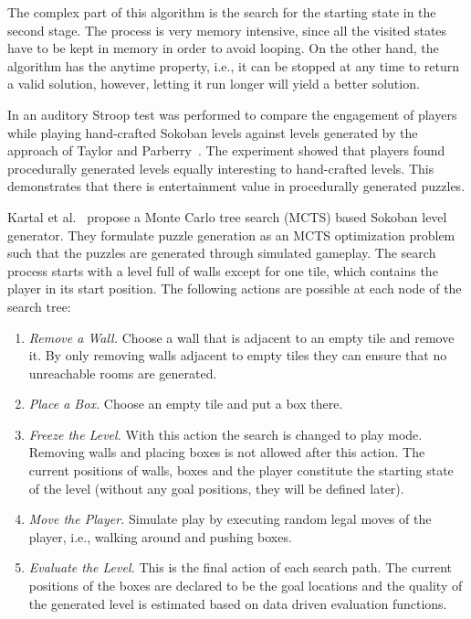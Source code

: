 \documentclass[runningheads]{llncs}
\begin{document}
The complex part of this algorithm is the search for the starting state in the second stage.
The process is very memory intensive, since all the visited states have to be kept in
memory in order to avoid looping. On the other hand, the algorithm has the anytime property, i.e., it
can be stopped at any time to return a valid solution, however, letting it run longer will yield
a better solution.

In \cite{taylor2015attention} an auditory Stroop test was performed to compare the engagement of
players while playing hand-crafted Sokoban levels against levels generated by the approach of
Taylor and Parberry~\cite{taylor2011procedural}. The experiment showed that players found
procedurally generated levels equally interesting to hand-crafted levels. This demonstrates
that there is entertainment value in procedurally generated puzzles.

Kartal et al.~\cite{kartal2016data} propose a Monte Carlo tree search (MCTS) based Sokoban level
generator. They formulate puzzle generation as an MCTS optimization problem such that the puzzles
are generated through simulated gameplay. The search process starts with a level full of walls except
for one tile, which contains the player in its start position. The following actions are possible at each
node of the search tree:
\begin{enumerate}
\item \emph{Remove a Wall.} Choose a wall that is adjacent to an empty tile and remove it. By only removing walls
adjacent to empty tiles they can ensure that no unreachable rooms are generated.
\item \emph{Place a Box.} Choose an empty tile and put a box there.
\item \emph{Freeze the Level.} With this action the search is changed to play mode. Removing walls and placing
boxes is not allowed after this action. The current positions of walls, boxes and the player constitute
the starting state of the level (without any goal positions, they will be defined later).
\item \emph{Move the Player.} Simulate play by executing random legal moves of the player, i.e., walking
around and pushing boxes.
\item \emph{Evaluate the Level.} This is the final action of each search path. The current positions of the boxes
are declared to be the goal locations and the quality of the generated level is estimated based on data driven
evaluation functions.
\end{enumerate}
\end{document}
